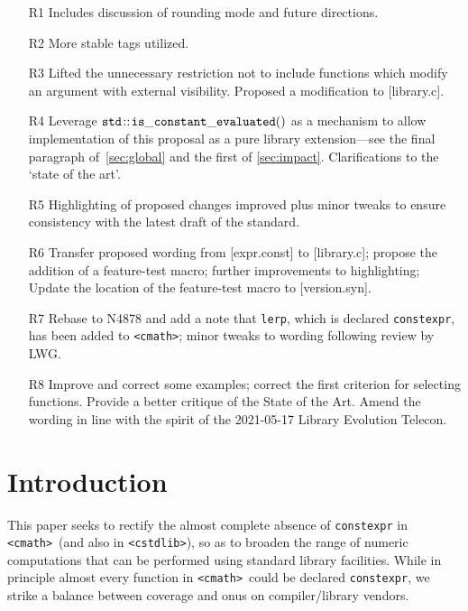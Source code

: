 \documentclass[prd,twocolumn,amsmath,amssymb,nofootinbib,eqsecnum]{revtex4-1}
\newcommand{\constexpr}{\code{constexpr}\xspace}
\newcommand{\code}[1]{{\tt #1}}
\newcommand{\header}[1]{{\tt <#1>}}
\newcommand{\cmath}{\header{cmath}}
\newcommand{\cstdlib}{\header{cstdlib}}
\begin{document}
\begin{enumerate}
	\item[R1] Includes discussion of rounding mode and future directions. 
	
	\item[R2] More stable tags utilized.
	
	\item[R3] Lifted the unnecessary restriction not to include functions which modify an argument with external visibility. Proposed a modification to [library.c].
	
	\item [R4] Leverage $\code{std\!::\!is\_constant\_evaluated()}$ as a mechanism to allow implementation of this proposal as a pure library extension---see the final paragraph of~\ref{sec:global} and the first of \ref{sec:impact}. Clarifications to the `state of the art'.
	
	\item [R5] Highlighting of proposed changes improved plus minor tweaks to ensure consistency with the latest draft of the standard.
	
	\item [R6] Transfer proposed wording from [expr.const] to [library.c]; propose the addition of a feature-test macro; further improvements to highlighting; Update the location of the feature-test macro to [version.syn].
	
	\item [R7] Rebase to N4878 and add a note that \code{lerp}, which is declared \constexpr, has been added to \cmath; minor tweaks to wording following review by LWG.
	
	\item [R8] Improve and correct some examples; correct the first criterion for selecting functions. Provide a better critique of the State of the Art. Amend the wording in line with the spirit of the 2021-05-17 Library Evolution Telecon.
\end{enumerate}


\section{Introduction}

This paper seeks to rectify the almost complete absence of \constexpr in
 \cmath\ (and also in \cstdlib), so as to broaden the range of numeric computations that can be
performed using standard library facilities. While in principle almost every function
in \cmath\ could be declared \constexpr, we strike a balance between coverage and onus on compiler/library vendors.
\end{document}
